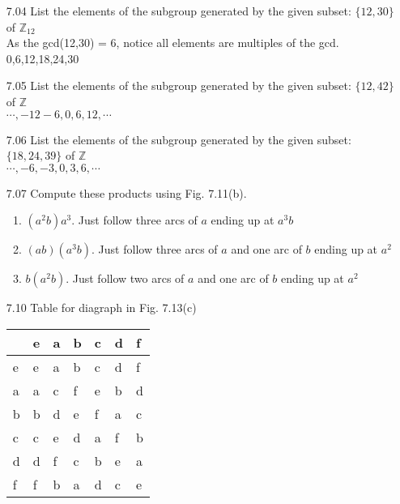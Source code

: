 \documentclass[12pt]{article}
\newcommand{\Z}{\mathds{Z}}
\begin{document}
\begin{enumerate}
	\item[7.04] List the elements of the subgroup generated by the given subset: $ \{12,30\} $ of $ \Z_{12} $\\
	As the gcd(12,30) = 6, notice all elements are multiples of the gcd.
	0,6,12,18,24,30
		
	\item[7.05] List the elements of the subgroup generated by the given subset: $ \{12,42\} $ of $ \Z $\\
		$ \cdots,-12-6,0,6,12, \cdots$
	\item[7.06] List the elements of the subgroup generated by the given subset: $ \{18,24,39\} $ of $ \Z $\\
		$ \cdots,-6,-3,0,3,6, \cdots$
	\item[7.07] Compute these products using Fig. 7.11(b).
		\begin{enumerate}
			\item $ (a^2b)a^3 $. Just follow three arcs of $ a $ ending up at $ a^3b $
			\item $ (ab)(a^3b) $. Just follow three arcs of $ a $ and one arc of $ b $ ending up at $ a^2 $
			\item $ b(a^2b) $. Just follow two arcs of $ a $ and one arc of $ b $ ending up at $ a^2 $
 		\end{enumerate}
	\item[7.10] Table for diagraph in Fig. 7.13(c)\\
	\begin{table}[!h]
		\begin{tabular}{l|llllll}
			& e & a & b & c & d & f \\ \hline
			e & e & a & b & c & d & f \\
			a & a & c & f & e & b & d \\
			b & b & d & e & f & a & c \\
			c & c & e & d & a & f & b \\
			d & d & f & c & b & e & a \\
			f & f & b & a & d & c & e
		\end{tabular}
	\end{table}
	

\end{enumerate}
\end{document}
